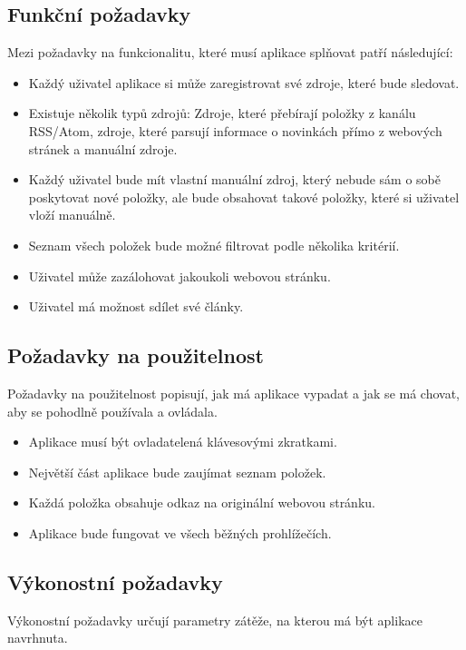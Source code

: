 \subsection{Funkční požadavky}

Mezi požadavky na funkcionalitu, které musí aplikace splňovat patří následující:

\begin{itemize}
    \item Každý uživatel aplikace si může zaregistrovat své zdroje, které bude sledovat.
    \item Existuje několik typů zdrojů: Zdroje, které přebírají položky z kanálu RSS/Atom, zdroje, které parsují informace o novinkách přímo z webových stránek a manuální zdroje.
    \item Každý uživatel bude mít vlastní manuální zdroj, který nebude sám o sobě poskytovat nové položky, ale bude obsahovat takové položky, které si uživatel vloží manuálně.
    \item Seznam všech položek bude možné filtrovat podle několika kritérií.
	\item Uživatel může zazálohovat jakoukoli webovou stránku.
	\item Uživatel má možnost sdílet své články.
\end{itemize}

\subsection{Požadavky na použitelnost}

Požadavky na použitelnost popisují, jak má aplikace vypadat a jak se má chovat, aby se pohodlně používala a ovládala.

\begin{itemize}
    \item Aplikace musí být ovladatelená klávesovými zkratkami.
    \item Největší část aplikace bude zaujímat seznam položek.
    \item Každá položka obsahuje odkaz na originální webovou stránku.
    \item Aplikace bude fungovat ve všech běžných prohlížečích.
\end{itemize}

\subsection{Výkonostní požadavky}

Výkonostní požadavky určují parametry zátěže, na kterou má být aplikace navrhnuta.

